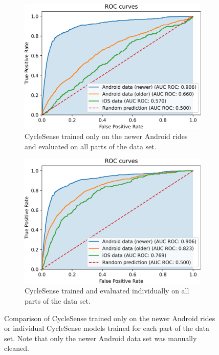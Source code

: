 \begin{figure}[t]
	\centering
	\begin{subfigure}[b]{0.475\textwidth}
		\centering
		\includegraphics[width=\textwidth]{fig/rocauctrainedon73.png}
		\caption{\small CycleSense trained only on the newer Android rides and evaluated on all parts of the data set.}
		\label{fig:traindonone}
	\end{subfigure}
	\hfill
	\begin{subfigure}[b]{0.475\textwidth}
		\centering
		\includegraphics[width=\textwidth]{fig/rocauctrainedindividually.png}
		\caption{\small CycleSense trained and evaluated individually on all parts of the data set. \newline}
		\label{fig:individually}
	\end{subfigure}
	\caption{Comparison of CycleSense trained only on the newer Android rides or individual CycleSense models trained for each part of the data set. Note that only the newer Android data set was manually cleaned.}
	\label{fig:comp-trainedonone-individually}
\end{figure}

